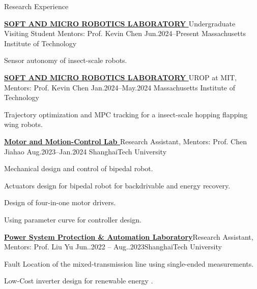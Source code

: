 \documentclass[]{ZhongtaoGuan-resume}
\begin{document}
\begin{section}{Research Experience}
\begin{subsection}{ \textbf{\href{https://smrl.mit.edu/}{SOFT AND MICRO ROBOTICS LABORATORY }}}{Undergraduate Visiting Student Mentors: Prof. Kevin Chen}{ Jun.2024--Present }{Massachusetts Institute of Technology}
     \item{Sensor autonomy of insect-scale robots.}
 \end{subsection}
\begin{subsection}{ \textbf{\href{https://smrl.mit.edu/}{SOFT AND MICRO ROBOTICS LABORATORY }}}{UROP at MIT, Mentors: Prof. Kevin Chen}{ Jan.2024--May.2024 }{Massachusetts Institute of Technology}
     \item{Trajectory optimization and MPC tracking for a insect-scale hopping flapping wing robots.}
 \end{subsection}
 
\begin{subsection}{ \textbf{\href{https://faculty.sist.shanghaitech.edu.cn/chenjh/}{Motor and Motion-Control Lab }}}{Research Assistant, Mentors: Prof. Chen Jiahao}{ Aug.2023--Jan.2024 }{ShanghaiTech University}
     \item{Mechanical design and control of bipedal robot.}
     \item{ Actuators design for bipedal robot for backdrivable and energy recovery.}
     \item{Design of four-in-one motor drivers.}
     \item {Using parameter curve for controller design.}
 \end{subsection}
 \begin{subsection}{\textbf{\href{https://pspal.shanghaitech.edu.cn/}{Power System Protection \& Automation Laboratory}}}{Research Assistant, Mentors: Prof. Liu Yu}{ Jun..2022 -- Aug..2023}{ShanghaiTech University}
     \item{Fault Location of the mixed-transmission line using single-ended measurements.}
     \item{Low-Cost inverter design for  renewable energy .}
 \end{subsection}
 
\end{section}

\newpage
\end{document}
